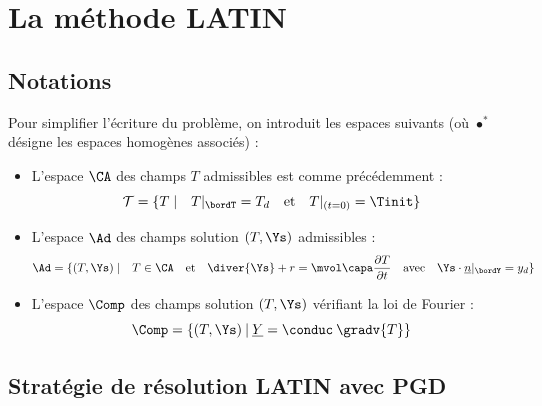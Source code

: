 \chapter{La méthode LATIN}
  
\section{Notations}\label{not_latin}

Pour simplifier l'écriture du problème, on introduit les espaces suivants (où $\bullet^*$ désigne les espaces homogènes associés) :\\
\begin{itemize}

\item L'espace $\CA$ des champs $T$ admissibles est comme précédemment :
 \begin{equation}
\mathcal{T} = \{ T \; | \quad T|_{ \bordT} = T_d \quad \textrm{et} \quad T|_{(t=0)} = \Tinit \}
\end{equation}

\item L'espace $\Ad$ des champs solution $(T, \Ys)$ admissibles :
 \begin{equation}
\Ad = \{ (T, \Ys) \; | \quad T \in \CA \quad \textrm{et} \quad  \diver{\Ys}+r = \mvol \capa \frac{\partial T}{\partial t} \quad \textrm{avec} \quad  \Ys  \cdot  \underline{n}|_{ \bordY } = y_d   \}
\end{equation}

\item L'espace $\Comp$ des champs solution $(T, \Ys)$ vérifiant la loi de Fourier :
 \begin{equation}
 \Comp = \left\{ (T, \Ys) \: | \: \underline{Y} = \conduc \:  \gradv{T} \right \}
\end{equation}

\end{itemize}


\section{Stratégie de résolution LATIN avec PGD}


